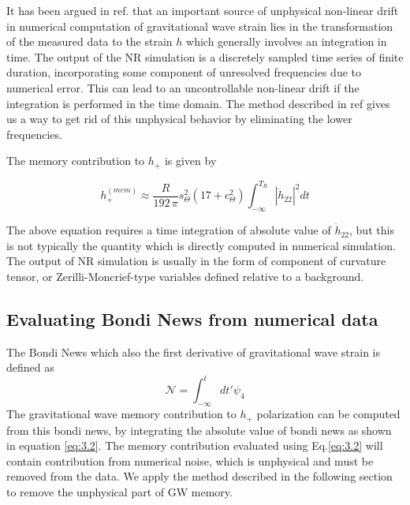 \documentclass[twocolumn,showpacs,aps,prd,nobibnotes,floatfix]{revtex4-1}
\begin{document}
\par It has been argued in ref. \cite{Reisswig_Pollney2011} that an important source of unphysical non-linear drift in numerical computation of gravitational wave strain lies in the transformation of the measured data to the strain $h$  which generally involves an integration in time. The output of the NR simulation is a discretely sampled time series of finite duration, incorporating some component of unresolved frequencies due to numerical error. This can lead to an uncontrollable non-linear drift if the integration is performed in the time domain. The method described in ref \cite{Reisswig_Pollney2011} gives us a way to get rid of this unphysical behavior by eliminating the lower frequencies.    
\par The memory contribution to $h_{+}$ is given by \cite{Favata2010}

\begin{equation}\label{eq:3.2}
h_{+}^{(mem)} \approx \frac{R}{192 \, \pi}s_{\Theta}^{2}\left(17 +c_{\Theta}^{2} \right)\int_{-\infty}^{T_R}|\dot{h}_{22}|^2 dt
\end{equation}

The above equation requires a time integration of absolute value of $\dot{h}_{22}$, but this is not typically the quantity which is directly computed in numerical simulation. The output of NR simulation is usually in the form of component of curvature tensor, or Zerilli-Moncrief-type variables defined relative to a background. 
\subsection{Evaluating Bondi News from numerical data}
The Bondi News which also the first derivative of gravitational wave strain is defined as
\begin{equation}\label{3.3}
\mathcal{N} = \int_{-\infty}^{t}dt' \psi_4
\end{equation}
The gravitational wave memory contribution to $h_{+}$ polarization can be computed from this bondi news, by integrating the absolute value of bondi news as shown in equation \ref{eq:3.2}. The memory contribution evaluated using Eq.\ref{eq:3.2} will contain contribution from numerical noise, which is unphysical and must be removed from the data. We apply the method described in the following section to remove the unphysical part of GW memory. 
\end{document}
